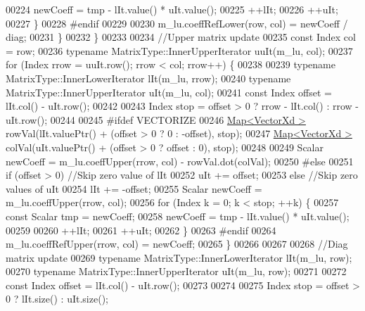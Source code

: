 \begin{DoxyCode}
00224                     newCoeff = tmp - lIt.value() * uIt.value();
00225                     ++lIt;
00226                     ++uIt;
00227                 \}
00228 \textcolor{preprocessor}{#endif}
00229 
00230                 m\_lu.coeffRefLower(row, col) = newCoeff / diag;
00231             \}
00232         \}
00233 
00234         \textcolor{comment}{//Upper matrix update}
00235         \textcolor{keyword}{const} Index col = row;
00236         \textcolor{keyword}{typename} MatrixType::InnerUpperIterator uuIt(m\_lu, col);
00237         \textcolor{keywordflow}{for} (Index rrow = uuIt.row(); rrow < col; rrow++) \{
00238 
00239             \textcolor{keyword}{typename} MatrixType::InnerLowerIterator lIt(m\_lu, rrow);
00240             \textcolor{keyword}{typename} MatrixType::InnerUpperIterator uIt(m\_lu, col);
00241             \textcolor{keyword}{const} Index offset = lIt.col() - uIt.row();
00242 
00243             Index stop = offset > 0 ? rrow - lIt.col() : rrow - uIt.row();
00244 
00245 \textcolor{preprocessor}{#ifdef VECTORIZE}
00246             \hyperlink{group___core___module_class_eigen_1_1_map}{Map<VectorXd >} rowVal(lIt.valuePtr() + (offset > 0 ? 0 : -offset), stop);
00247             \hyperlink{group___core___module_class_eigen_1_1_map}{Map<VectorXd >} colVal(uIt.valuePtr() + (offset > 0 ? offset : 0), stop);
00248 
00249             Scalar newCoeff = m\_lu.coeffUpper(rrow, col) - rowVal.dot(colVal);
00250 \textcolor{preprocessor}{#else}
00251             \textcolor{keywordflow}{if} (offset > 0) \textcolor{comment}{//Skip zero value of lIt}
00252                 uIt += offset;
00253             \textcolor{keywordflow}{else} \textcolor{comment}{//Skip zero values of uIt}
00254                 lIt += -offset;
00255             Scalar newCoeff = m\_lu.coeffUpper(rrow, col);
00256             \textcolor{keywordflow}{for} (Index k = 0; k < stop; ++k) \{
00257                 \textcolor{keyword}{const} Scalar tmp = newCoeff;
00258                 newCoeff = tmp - lIt.value() * uIt.value();
00259 
00260                 ++lIt;
00261                 ++uIt;
00262             \}
00263 \textcolor{preprocessor}{#endif}
00264             m\_lu.coeffRefUpper(rrow, col) = newCoeff;
00265         \}
00266 
00267 
00268         \textcolor{comment}{//Diag matrix update}
00269         \textcolor{keyword}{typename} MatrixType::InnerLowerIterator lIt(m\_lu, row);
00270         \textcolor{keyword}{typename} MatrixType::InnerUpperIterator uIt(m\_lu, row);
00271 
00272         \textcolor{keyword}{const} Index offset = lIt.col() - uIt.row();
00273 
00274 
00275         Index stop = offset > 0 ? lIt.size() : uIt.size();

\end{DoxyCode}
